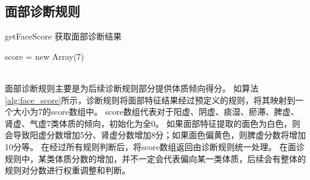 %
%
%


\subsection{面部诊断规则}

\begin{algorithm}[htbp]
    \caption{getFaceScore 获取面部诊断结果\cite{张红凯2018基于舌}}%
    \label{alg:face_score}
    \LinesNumbered %
    score = new Array(7) \\

    \\
\end{algorithm}

面部诊断规则主要是为后续诊断规则部分提供体质倾向得分。
如算法\ref{alg:face_score}所示，诊断规则将面部特征结果经过预定义的规则，将其映射到一个大小为7的score数组中。
score数组代表对于阳虚、阴虚、痰湿、瘀滞、脾虚、肾虚、气虚7类体质的倾向，初始化为全0。
如果面部特征提取的面色为白色，则会导致阳虚分数增加5分、肾虚分数增加8分；如果面色偏黄色，则脾虚分数将增加10分等。
在经过所有规则判断后，将score数组返回由诊断规则统一处理。
在面诊规则中，某类体质分数的增加，并不一定会代表偏向某一类体质，后续会有整体的规则对分数进行权重调整和判断。


